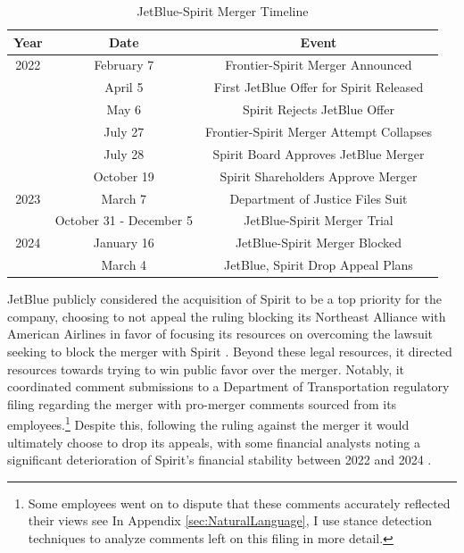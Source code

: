 \documentclass{article}
\begin{document}
    	\begin{table}[tb]
		\caption{JetBlue-Spirit Merger Timeline}
		\label{tab:JetBlue_Spirit_Timeline}
		\begin{center}
			\begin{tabular}{ccc}
				\hline
				Year & Date & Event \\
				\hline
				2022 & February 7 & Frontier-Spirit Merger Announced \\
				& April 5 &  First JetBlue Offer for Spirit Released\\
				& May 6 & Spirit Rejects JetBlue Offer \\
				& July 27 &  Frontier-Spirit Merger Attempt Collapses\\
				& July 28 &  Spirit Board Approves JetBlue Merger\\
				& October 19 & Spirit Shareholders Approve Merger \\
				\hline
				2023 & March 7 &  Department of Justice Files Suit\\
				& October 31 - December 5 &  JetBlue-Spirit Merger Trial \\
				\hline
				2024 & January 16 & JetBlue-Spirit Merger Blocked \\
				& March 4 & JetBlue, Spirit Drop Appeal Plans \\
			\end{tabular}
		\end{center}
	\end{table}

	JetBlue publicly considered the acquisition of Spirit to be a top priority for the company, choosing to not appeal the ruling blocking its Northeast Alliance with American Airlines in favor of focusing its resources on overcoming the lawsuit seeking to block the merger with Spirit \citep{aratani_jetblue_2023}. Beyond these legal resources, it directed resources towards trying to win public favor over the merger. Notably, it coordinated comment submissions to a Department of Transportation regulatory filing regarding the merger with pro-merger comments sourced from its employees.\footnote{Some employees went on to dispute that these comments accurately reflected their views see \citet{birnbaum_elizabeth_2023, birnbaum_jet-blue_2023} In Appendix \ref{sec:NaturalLanguage}, I use stance detection techniques to analyze comments left on this filing in more detail.} Despite this, following the ruling against the merger it would ultimately choose to drop its appeals, with some financial analysts noting a significant deterioration of Spirit's financial stability between 2022 and 2024 \citep{sider_jetblue_2024}. 
	
\end{document}
